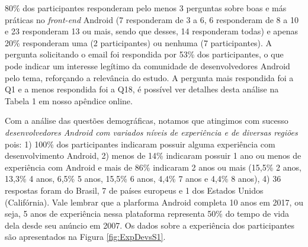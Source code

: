 

80\% dos participantes responderam pelo menos 3 perguntas sobre boas e más práticas no \textit{front-end} Android (7 responderam de 3 a 6, 6 responderam de 8 a 10 e 23 responderam 13 ou mais, sendo que desses, 14 responderam todas) e apenas 20\% responderam uma (2 participantes) ou nenhuma (7 participantes). A pergunta solicitando o email foi respondida por 53\% dos participantes, o que pode indicar um interesse legítimo da comunidade de desenvolvedores Android pelo tema, reforçando a relevância do estudo. A pergunta mais respondida foi a Q1 e a menos respondida foi a Q18, é possível ver detalhes desta análise na Tabela 1 em nosso apêndice online.



Com a análise das questões demográficas, notamos que atingimos com sucesso \textit{desenvolvedores Android com variados níveis de experiência e de diversas regiões} pois: 1) 100\% dos participantes indicaram possuir alguma experiência com desenvolvimento Android, 2) menos de 14\% indicaram possuir 1 ano ou menos de experiência com Android e mais de 86\% indicaram 2 anos ou mais (15,5\% 2 anos, 13,3\% 4 anos, 6,5\% 5 anos, 15,5\% 6 anos, 4,4\% 7 anos e 4,4\% 8 anos), 4) 36 respostas foram do Brasil, 7 de países europeus e 1 dos Estados Unidos (Califórnia). Vale lembrar que a plarforma Android completa 10 anos em 2017, ou seja, 5 anos de experiência nessa plataforma representa 50\% do tempo de vida dela desde seu anúncio em 2007. Os dados sobre a experiência dos participantes são apresentados na Figura \ref{fig:ExpDevsS1}.


